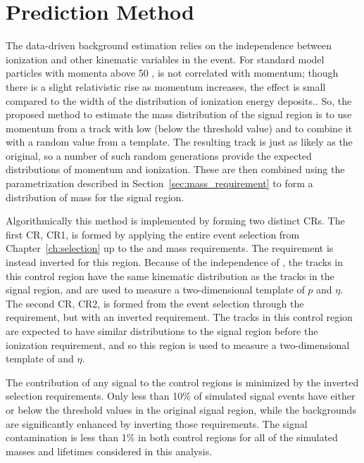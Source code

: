 
\section{Prediction Method}
\label{sec:background_method}
The data-driven background estimation relies on the independence between ionization and other kinematic variables in the event.
For standard model particles with momenta above 50 \GeV, \dedx is not correlated with momentum; though there is a slight relativistic rise as momentum increases, the effect is small compared to the width of the distribution of ionization energy deposits..
So, the proposed method to estimate the mass distribution of the signal region is to use momentum from a track with low \dedx (below the threshold value) and to combine it with a random \dedx value from a \dedx template.
The resulting track is just as likely as the original, so a number of such random generations provide the expected distributions of momentum and ionization.
These are then combined using the parametrization described in Section~\ref{sec:mass_requirement} to form a distribution of mass for the signal region.

Algorithmically this method is implemented by forming two distinct \acp{CR}.
The first \ac{CR}, CR1, is formed by applying the entire event selection from Chapter~\ref{ch:selection} up to the \dedx and mass requirements.
The \dedx requirement is instead inverted for this region.
Because of the independence of \dedx, the tracks in this control region have the same kinematic distribution as the tracks in the signal region, and are used to measure a two-dimensional template of $p$ and $\eta$. 
The second \ac{CR}, CR2, is formed from the event selection through the \dedx requirement, but with an inverted \met requirement.
The tracks in this control region are expected to have similar \dedx distributions to the signal region before the ionization requirement, and so this region is used to measure a two-dimensional template of \dedx and $\eta$. 

The contribution of any signal to the control regions is minimized by the inverted selection requirements.
Only less than 10\% of simulated signal events have either \dedx or \met below the threshold values in the original signal region, while the backgrounds are significantly enhanced by inverting those requirements.
The signal contamination is less than 1\% in both control regions for all of the simulated masses and lifetimes considered in this analysis.

